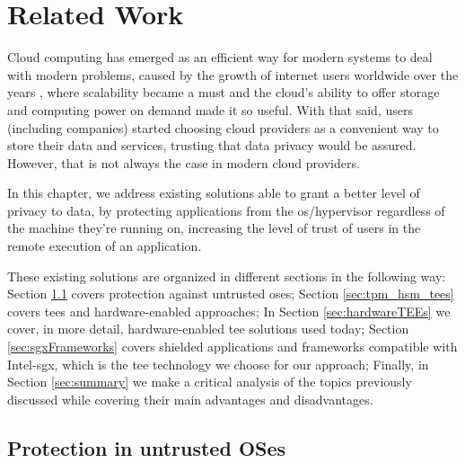 \chapter{Related Work}
\label{cha:related_work}

Cloud computing has emerged as an efficient way for modern systems to deal with modern problems, caused by the growth of internet users worldwide over the years \cite{growthInternetUsers}, where scalability became a must and the cloud's ability to offer storage and computing power on demand made it so useful.
With that said, users (including companies) started choosing cloud providers as a convenient way to store their data and services, trusting that data privacy would be assured. However, that is not always the case in modern cloud providers. 

In this chapter, we address existing solutions able to grant a better level of privacy to data, by protecting applications from the \gls{os}/hypervisor regardless of the machine they're running on, increasing the level of trust of users in the remote execution of an application.

These existing solutions are organized in different sections in the following way: 
Section \ref{sec:protect_untrustOS} covers protection against untrusted \gls{os}es; 
Section \ref{sec:tpm_hsm_tees} covers \gls{tee}s and hardware-enabled approaches;
In Section \ref{sec:hardwareTEEs} we cover, in more detail, hardware-enabled \gls{tee} solutions used today;
Section \ref{sec:sgxFrameworks} covers shielded applications and frameworks compatible with Intel-\gls{sgx}, which is the \gls{tee} technology we choose for our approach;
Finally, in Section \ref{sec:summary} we make a critical analysis of the topics previously discussed while covering their main advantages and disadvantages.




\section{Protection in untrusted OSes}
\label{sec:protect_untrustOS}


